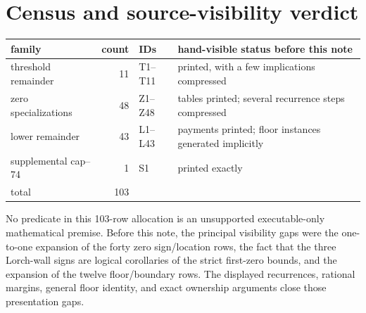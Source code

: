\documentclass[11pt]{article}
\begin{document}
\section{Census and source-visibility verdict}

\begin{center}
\begin{tabular}{l|r|l|l}
\toprule
family&count&IDs&hand-visible status before this note\\
\midrule
threshold remainder&11&T1--T11&printed, with a few implications compressed\\
zero specializations&48&Z1--Z48&tables printed; several recurrence steps compressed\\
lower remainder&43&L1--L43&payments printed; floor instances generated implicitly\\
supplemental cap--74&1&S1&printed exactly\\
\midrule
total&103&&\\
\bottomrule
\end{tabular}
\end{center}

No predicate in this 103-row allocation is an unsupported executable-only
mathematical premise.  Before this note, the principal visibility gaps were
the one-to-one expansion of the forty zero sign/location rows, the fact that
the three Lorch-wall signs are logical corollaries of the strict first-zero
bounds, and the expansion of the twelve floor/boundary rows.  The displayed
recurrences, rational margins, general floor identity, and exact ownership
arguments close those presentation gaps.
\end{document}
